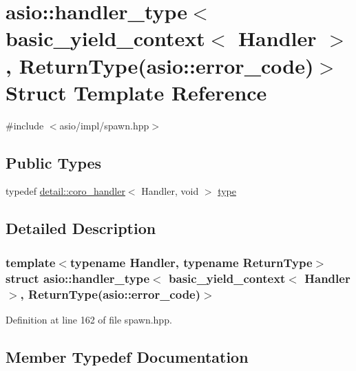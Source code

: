 \hypertarget{structasio_1_1handler__type_3_01basic__yield__context_3_01_handler_01_4_00_01_01_01_01_01_01_01_4293f21a96d71a94577a209dcb83a1de}{}\section{asio\+:\+:handler\+\_\+type$<$ basic\+\_\+yield\+\_\+context$<$ Handler $>$, Return\+Type(asio\+:\+:error\+\_\+code)$>$ Struct Template Reference}
\label{structasio_1_1handler__type_3_01basic__yield__context_3_01_handler_01_4_00_01_01_01_01_01_01_01_4293f21a96d71a94577a209dcb83a1de}


{\ttfamily \#include $<$asio/impl/spawn.\+hpp$>$}

\subsection*{Public Types}
\begin{DoxyCompactItemize}
\item 
typedef \hyperlink{classasio_1_1detail_1_1coro__handler}{detail\+::coro\+\_\+handler}$<$ Handler, void $>$ \hyperlink{structasio_1_1handler__type_3_01basic__yield__context_3_01_handler_01_4_00_01_01_01_01_01_01_01_4293f21a96d71a94577a209dcb83a1de_ac76d9787a62f2c5d51878a825a6fa194}{type}
\end{DoxyCompactItemize}


\subsection{Detailed Description}
\subsubsection*{template$<$typename Handler, typename Return\+Type$>$struct asio\+::handler\+\_\+type$<$ basic\+\_\+yield\+\_\+context$<$ Handler $>$,           Return\+Type(asio\+::error\+\_\+code)$>$}



Definition at line 162 of file spawn.\+hpp.



\subsection{Member Typedef Documentation}
\hypertarget{structasio_1_1handler__type_3_01basic__yield__context_3_01_handler_01_4_00_01_01_01_01_01_01_01_4293f21a96d71a94577a209dcb83a1de_ac76d9787a62f2c5d51878a825a6fa194}{}
